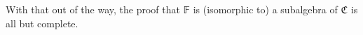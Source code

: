 \ccpad
With that out of the way, the proof that \af 𝔽 is (isomorphic to) a subalgebra of \af ℭ is all but complete.
\ccpad
\begin{code}%
\>[0][@{}l@{\AgdaIndent{1}}]%
\>[1]\AgdaSpace{}%
\AgdaSymbol{:}\AgdaSpace{}%
\AgdaSpace{}%
\AgdaSpace{}%
\AgdaSpace{}%
\AgdaSpace{}%
\AgdaSpace{}%
\AgdaSpace{}%
\AgdaSpace{}%
\<%
\\
%
\>[1]\AgdaSpace{}%
\AgdaSpace{}%
\AgdaSymbol{=}\AgdaSpace{}%
\AgdaSpace{}%
\AgdaSpace{}%
\AgdaSpace{}%
\AgdaOperator{\AgdaInductiveConstructor{,}}\AgdaSpace{}%
\AgdaSymbol{(}\AgdaSpace{}%
\AgdaOperator{\AgdaInductiveConstructor{,}}\AgdaSpace{}%
\AgdaSpace{}%
\AgdaSpace{}%
\AgdaSymbol{)}\<%
\\
\>[1][@{}l@{\AgdaIndent{0}}]%
\>[2]\<%
\\
\>[2][@{}l@{\AgdaIndent{0}}]%
\>[3]\AgdaSpace{}%
\AgdaSymbol{:}\AgdaSpace{}%
\AgdaSpace{}%
\AgdaSpace{}%
\AgdaSpace{}%
\<%
\\
%
\>[3]\AgdaSpace{}%
\AgdaSymbol{=}\AgdaSpace{}%
\AgdaSpace{}%
\AgdaSpace{}%
\AgdaSpace{}%
\AgdaSpace{}%
\AgdaSpace{}%
\<%
\end{code}

